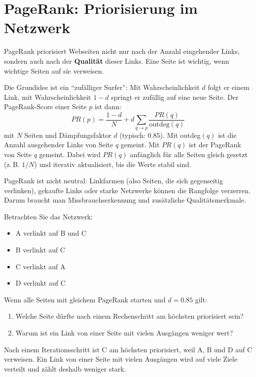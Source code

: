 \section{PageRank: Priorisierung im Netzwerk}

\begin{mydefinition}[PageRank]
    PageRank priorisiert Webseiten nicht nur nach der Anzahl eingehender Links,
    sondern auch nach der \textbf{Qualität} dieser Links.
    Eine Seite ist wichtig, wenn wichtige Seiten auf sie verweisen.
\end{mydefinition}

Die Grundidee ist ein \enquote{zufälliger Surfer}:
Mit Wahrscheinlichkeit $d$ folgt er einem Link, mit Wahrscheinlichkeit $1-d$ springt er zufällig auf eine neue Seite.
Der PageRank-Score einer Seite $p$ ist dann:
\[
    PR(p) = \frac{1-d}{N} + d \sum_{q \to p} \frac{PR(q)}{\text{outdeg}(q)}
\]
mit $N$ Seiten und Dämpfungsfaktor $d$ (typisch: $0.85$). Mit outdeg$(q)$ ist die Anzahl ausgehender Links von Seite $q$ gemeint. Mit $PR(q)$ ist der PageRank von Seite $q$ gemeint. Dabei wird $PR(q)$ anfänglich für alle Seiten gleich gesetzt (z.\,B. $1/N$) und iterativ aktualisiert, bis die Werte stabil sind.

\begin{mycaution}
    PageRank ist nicht neutral: Linkfarmen (also Seiten, die sich gegenseitig verlinken), gekaufte Links oder starke Netzwerke können die Rangfolge verzerren.
    Darum braucht man Missbrauchserkennung und zusätzliche Qualitätsmerkmale.
\end{mycaution}

\begin{myexercise}
    Betrachten Sie das Netzwerk:
    \begin{itemize}
        \item A verlinkt auf B und C
        \item B verlinkt auf C
        \item C verlinkt auf A
        \item D verlinkt auf C
    \end{itemize}
    Wenn alle Seiten mit gleichem PageRank starten und $d=0.85$ gilt:
    \begin{enumerate}
        \item Welche Seite dürfte nach einem Rechenschritt am höchsten priorisiert sein?
        \item Warum ist ein Link von einer Seite mit vielen Ausgängen weniger wert?
    \end{enumerate}
    \begin{myanswer}
        Nach einem Iterationsschritt ist C am höchsten priorisiert, weil A, B und D auf C verweisen.
        Ein Link von einer Seite mit vielen Ausgängen wird auf viele Ziele verteilt und zählt deshalb weniger stark.
    \end{myanswer}
\end{myexercise}

